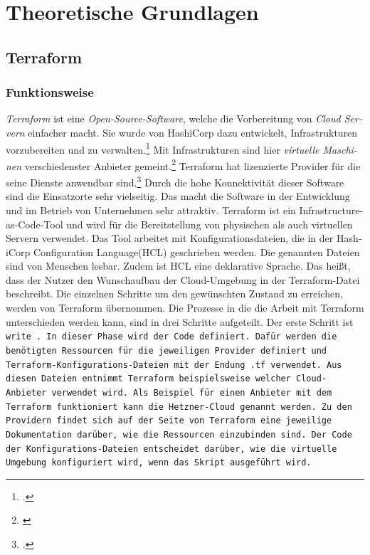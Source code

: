 \section{Theoretische Grundlagen} 
\subsection{Terraform}
\begin{otherlanguage}{ngerman}
\subsubsection{Funktionsweise}
\textit{Terraform} ist eine \textit{Open-Source-Software}, welche die Vorbereitung von \textit{Cloud Servern} einfacher macht. Sie wurde von HashiCorp dazu entwickelt, Infrastrukturen vorzubereiten und zu verwalten.\footcite{introform} Mit Infrastrukturen sind hier \textit{virtuelle Maschinen} verschiedenster Anbieter gemeint.\footnote{\cite{Terraform}} Terraform hat lizenzierte Provider für die seine Dienste anwendbar sind.\footcite{TerraProviders} Durch die hohe Konnektivität dieser Software sind die Einsatzorte sehr vielseitig. Das macht die Software in der Entwicklung und im Betrieb von Unternehmen sehr attraktiv. 
\newline
\newline
Terraform ist ein Infrastructure-as-Code-Tool und wird für die Bereitstellung von physischen als auch virtuellen Servern verwendet. Das Tool arbeitet mit Konfigurationsdateien, die in der HashiCorp Configuration Language(HCL) geschrieben werden. Die genannten Dateien sind von Menschen lesbar. Zudem ist HCL eine deklarative Sprache. Das heißt, dass der Nutzer den Wunschaufbau der Cloud-Umgebung in der Terraform-Datei beschreibt. Die einzelnen Schritte um den gewünschten Zustand zu erreichen, werden von Terraform übernommen. 
\newline
Die Prozesse in die die Arbeit mit Terraform unterschieden werden kann, sind in drei Schritte aufgeteilt. Der erste Schritt ist \tt write \rm. In dieser Phase wird der Code definiert. Dafür werden die benötigten Ressourcen für die jeweiligen Provider definiert und Terraform-Konfigurations-Dateien mit der Endung \tt .tf \rm verwendet. Aus diesen Dateien entnimmt Terraform beispielsweise welcher Cloud-Anbieter verwendet wird. Als Beispiel für einen Anbieter mit dem Terraform funktioniert kann die \dq Hetzner-Cloud \dq{} genannt werden. Zu den Providern findet sich auf der Seite von Terraform eine jeweilige Dokumentation darüber, wie die Ressourcen einzubinden sind. Der Code der Konfigurations-Dateien entscheidet darüber, wie die virtuelle Umgebung konfiguriert wird, wenn das Skript ausgeführt wird. 

\end{otherlanguage}
